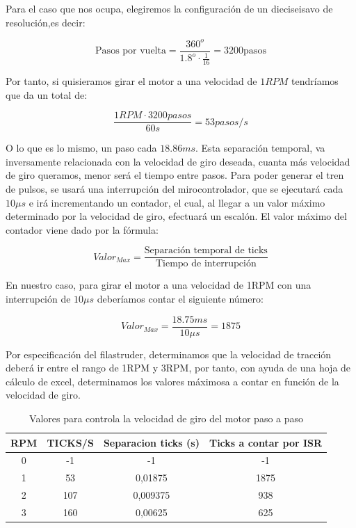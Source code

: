 Para el caso que nos ocupa, elegiremos la configuración de un dieciseisavo de resolución,es decir:

$$ \text{Pasos por vuelta} = \frac{360^o}{1.8^o \cdot \frac{1}{16} } = 3200 \text{pasos}  $$

Por tanto, si quisieramos girar el motor a una velocidad de $1RPM$ tendríamos que da un total de:

$$\frac{1 RPM \cdot 3200 pasos}{60 s} = 53 pasos/s$$

O lo que es lo mismo, un paso cada $18.86 ms$. Esta separación temporal, va inversamente relacionada con la velocidad de giro deseada, cuanta más velocidad de giro queramos, menor será el tiempo entre pasos. Para poder generar el tren de pulsos, se usará una interrupción del mirocontrolador, que se ejecutará cada $10\mu s$ e irá incrementando un contador, el cual, al llegar a un valor máximo determinado por la velocidad de giro, efectuará un escalón. El valor máximo del contador viene dado por la fórmula:

$$ Valor_{Max} = \frac{\text{Separación temporal de ticks}}{\text{Tiempo de interrupción}}$$

En nuestro caso, para girar el motor a una velocidad de 1RPM con una interrupción de $10\mu s$ deberíamos contar el siguiente número:

$$Valor_{Max} = \frac{18.75 ms}{10\mu s} = 1875$$

Por especificación del filastruder, determinamos que la velocidad de tracción deberá ir entre el rango de 1RPM y 3RPM, por tanto, con ayuda de una hoja de cálculo de excel, determinamos los valores máximosa a contar en función de la velocidad de giro.

\begin{table}[H]
    \centering
    \begin{tabular}{cccc}
        \multicolumn{1}{l}{{\bf RPM}} & \multicolumn{1}{l}{{\bf TICKS/S}} & \multicolumn{1}{l}{{\bf Separacion ticks (s)}} & \multicolumn{1}{l}{{\bf Ticks a contar por ISR}} \\
        \hline
        0 & -1 & -1 & -1 \\
        1 & 53 & 0,01875 & 1875 \\
        2 & 107 & 0,009375 & 938 \\
        3 & 160 & 0,00625 & 625
    \end{tabular}
    \caption{Valores para controla la velocidad de giro del motor paso a paso}
    \label{tab:valores_paso_paso}
\end{table}

